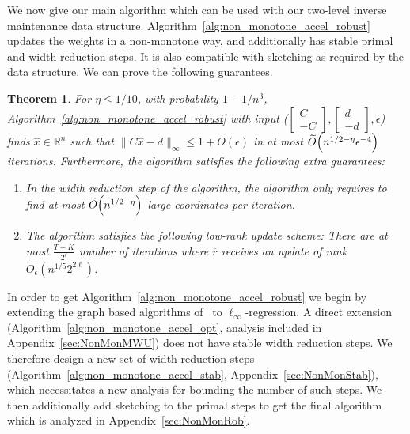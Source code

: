 \documentclass[11pt]{article}
\newtheorem{theorem}{Theorem}[section]
\let\originalleft\left
\let\originalright\right
\renewcommand{\left}{\mathopen{}\mathclose\bgroup\originalleft}
\renewcommand{\right}{\aftergroup\egroup\originalright}
\newcommand\dd{\boldsymbol{\mathit{d}}}
\newcommand\rr{\boldsymbol{\mathit{r}}}
\newcommand\xx{\boldsymbol{\mathit{x}}}
\newcommand\CC{\boldsymbol{\mathit{C}}}
\newcommand\xxhat{\widehat{\xx}}
\newcommand\Otil{\widetilde{O}}
\newcommand{\ov}{\overline}
\begin{document}
We now give our main algorithm which can be used with our two-level inverse maintenance data structure. Algorithm~\ref{alg:non_monotone_accel_robust} updates the weights in a non-monotone way, and additionally has stable primal and width reduction steps. It is also compatible with sketching as required by the data structure. We can prove the following guarantees.

\begin{theorem}\label{thm:RobustAccMWU}
For $\eta\leq 1/10$, with probability $1-1/n^3$, Algorithm~\ref{alg:non_monotone_accel_robust} with input ($\begin{bmatrix}
    \CC\\ -\CC
\end{bmatrix}, \begin{bmatrix}
    \dd\\ -\dd
\end{bmatrix}, \epsilon$) finds $\xxhat\in \mathbb{R}^n$ such that $\|\CC\xxhat-\dd\|_{\infty} \leq 1+O(\epsilon)$ in at most $\Otil\left(n^{1/2-\eta}\epsilon^{-4}\right)$ iterations. Furthermore, the algorithm satisfies the following extra guarantees:
\begin{enumerate}
    \item In the width reduction step of the algorithm, the algorithm only requires to find at most $\Otil\left(n^{1/2+\eta}\right)$ large coordinates per iteration.
    \item The algorithm satisfies the following low-rank update scheme: There are at most $\frac{T+K}{2^{\ell}}$ number of iterations where $\ov{\rr}$ receives an update of rank $\Otil_{\epsilon}(n^{1/5} 2^{2 \ell})$.
\end{enumerate}
\end{theorem}

In order to get Algorithm~\ref{alg:non_monotone_accel_robust} we begin by extending the graph based algorithms of~\cite{madry2016computing} to $\ell_{\infty}$-regression. A direct extension (Algorithm~\ref{alg:non_monotone_accel_opt}, analysis included in Appendix~\ref{sec:NonMonMWU}) does not have stable width reduction steps. We therefore design a new set of width reduction steps (Algorithm~\ref{alg:non_monotone_accel_stab}, Appendix~\ref{sec:NonMonStab}), which necessitates a new analysis for bounding the number of such steps. We then additionally add sketching to the primal steps to get the final algorithm which is analyzed in Appendix~\ref{sec:NonMonRob}. 
\end{document}
